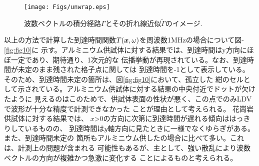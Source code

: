 \begin{figure}
\begin{center}
	\texttt{[image: Figs/unwrap.eps]}
	\caption{波数ベクトルの積分経路$\Gamma$とその折れ線近似$\tilde \Gamma$のイメージ.}
	\label{fig:fig12}
\end{center}
\end{figure}
以上の方法で計算した到達時間関数$T(\mbox{\boldmath{$x$}},\omega)$を周波数1MHzの場合について図-\ref{fig:fig10}に
示す。アルミニウム供試体に対する結果では、到達時間はy方向にほぼ一定であり、期待通り、1次元的な
伝播挙動が再現されている。なお、到達時間が未定のまま残された格子点に関しては
到達時間を-1として表示している。そのため、到達時間未定の箇所は、図\ref{fig:fig10}において、孤立した
紺のセルとして示されている。アルミニウム供試体に対する結果の中央付近でドットが欠けたように
見えるのはこのためで、供試体表面の性状が悪く、この点でのみLDVで波形が十分な精度で計測できなかった
ことが理由として考えられる。
花崗岩供試体に対する結果では、
$x$>0の方向に次第に到達時間が遅れる傾向ははっきりしているものの、
到達時間は$y$軸方向に見たときに一様でなくゆらぎがある。また、到達時間未定の
箇所もアルミニウム供したの場合に比べて多い。これは、計測上の問題が含まれる
可能性もあるが、主として、強い散乱により波数ベクトルの方向が複雑かつ急激に変化する
ことによるものと考えられる。

